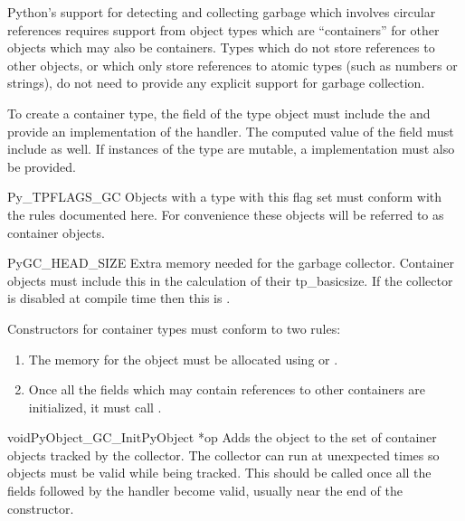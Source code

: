 \documentclass{manual}
\begin{document}
Python's support for detecting and collecting garbage which involves
circular references requires support from object types which are
``containers'' for other objects which may also be containers.  Types
which do not store references to other objects, or which only store
references to atomic types (such as numbers or strings), do not need
to provide any explicit support for garbage collection.

To create a container type, the  field of the type
object must include the  and provide an
implementation of the  handler.  The computed
value of the  field must include
 as well.  If instances of the type are
mutable, a  implementation must also be provided.

\begin{datadesc}{Py_TPFLAGS_GC}
  Objects with a type with this flag set must conform with the rules
  documented here.  For convenience these objects will be referred to
  as container objects.
\end{datadesc}

\begin{datadesc}{PyGC_HEAD_SIZE}
  Extra memory needed for the garbage collector.  Container objects
  must include this in the calculation of their tp_basicsize.  If the
  collector is disabled at compile time then this is .
\end{datadesc}

Constructors for container types must conform to two rules:

\begin{enumerate}
\item  The memory for the object must be allocated using
        or .

\item  Once all the fields which may contain references to other
       containers are initialized, it must call
       .
\end{enumerate}

\begin{cfuncdesc}{void}{PyObject_GC_Init}{PyObject *op}
  Adds the object  to the set of container objects tracked by
  the collector.  The collector can run at unexpected times so objects
  must be valid while being tracked.  This should be called once all
  the fields followed by the  handler become valid,
  usually near the end of the constructor.
\end{cfuncdesc}
\end{document}
